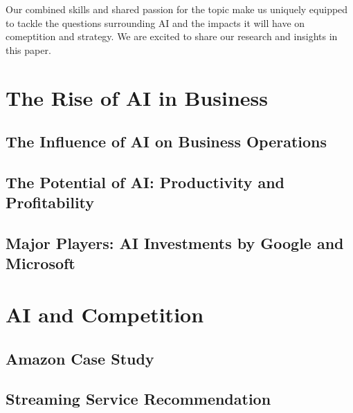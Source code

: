 \documentclass[
]{book}
\begin{document}
Our combined skills and shared passion for the topic make us uniquely equipped to tackle the questions surrounding AI and the impacts it will have on comeptition and strategy. We are excited to share our research and insights in this paper.

\hypertarget{the-rise-of-ai-in-business}{%
\chapter{The Rise of AI in Business}\label{the-rise-of-ai-in-business}}

\hypertarget{the-influence-of-ai-on-business-operations}{%
\section{The Influence of AI on Business Operations}\label{the-influence-of-ai-on-business-operations}}

\hypertarget{the-potential-of-ai-productivity-and-profitability}{%
\section{The Potential of AI: Productivity and Profitability}\label{the-potential-of-ai-productivity-and-profitability}}

\hypertarget{major-players-ai-investments-by-google-and-microsoft}{%
\section{Major Players: AI Investments by Google and Microsoft}\label{major-players-ai-investments-by-google-and-microsoft}}

\hypertarget{ai-and-competition}{%
\chapter{AI and Competition}\label{ai-and-competition}}

\hypertarget{amazon-case-study}{%
\section{Amazon Case Study}\label{amazon-case-study}}

\hypertarget{streaming-service-recommendation}{%
\section{Streaming Service Recommendation}\label{streaming-service-recommendation}}
\end{document}
